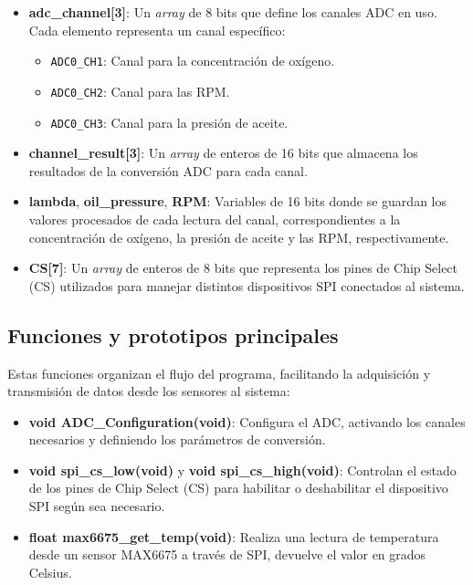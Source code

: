 \begin{itemize}
    \item \textbf{adc\_channel[3]}: Un \textit{array} de 8 bits que define los canales ADC en uso. Cada elemento representa un canal específico:
        \begin{itemize}
            \item \texttt{ADC0\_CH1}: Canal para la concentración de oxígeno.
            \item \texttt{ADC0\_CH2}: Canal para las RPM.
            \item \texttt{ADC0\_CH3}: Canal para la presión de aceite.
        \end{itemize}
        
    \item \textbf{channel\_result[3]}: Un \textit{array} de enteros de 16 bits que almacena los resultados de la conversión ADC para cada canal.

    \item \textbf{lambda}, \textbf{oil\_pressure}, \textbf{RPM}: Variables de 16 bits donde se guardan los valores procesados de cada lectura del canal, correspondientes a la concentración de oxígeno, la presión de aceite y las RPM, respectivamente.

    \item \textbf{CS[7]}: Un \textit{array} de enteros de 8 bits que representa los pines de Chip Select (CS) utilizados para manejar distintos dispositivos SPI conectados al sistema.
\end{itemize}

\subsection{Funciones y prototipos principales}

Estas funciones organizan el flujo del programa, facilitando la adquisición y transmisión de datos desde los sensores al sistema:

\begin{itemize}
    \item \textbf{void ADC\_Configuration(void)}: Configura el ADC, activando los canales necesarios y definiendo los parámetros de conversión.

    \item \textbf{void spi\_cs\_low(void)} y \textbf{void spi\_cs\_high(void)}: Controlan el estado de los pines de Chip Select (CS) para habilitar o deshabilitar el dispositivo SPI según sea necesario.

    \item \textbf{float max6675\_get\_temp(void)}: Realiza una lectura de temperatura desde un sensor MAX6675 a través de SPI, devuelve el valor en grados Celsius.
\end{itemize}

